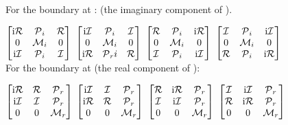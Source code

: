 \documentclass[]{iucr}              %
\numberwithin{equation}{section}
\newcommand{\Imaginary}[0]{\mathcal{I}}
\newcommand{\Real}[0]{\mathcal{R}}
\begin{document}
	
	For the boundary at \sv: (the imaginary component of \cii{}).
	
	$\begin{bmatrix}
		\textrm{i}\Real{}	& \Plus{}_i		& \Real{} \\
		0				& \Minus{}_i	& 0 \\
		\textrm{i}\Imaginary{}	& \Plus{}_i		& \Imaginary{}
	\end{bmatrix}$
	$\begin{bmatrix}
		\textrm{i}\Imaginary{}	& \Plus{}_i		&  \Imaginary{} \\
		0				& \Minus{}_i	& 0 \\
		\textrm{i}\Real{}	& \Plus{}_ri	& \Real{} \\
	\end{bmatrix}$ 
	$\begin{bmatrix}
		\Real{}	&\Plus{}_i		&   \textrm{i}\Real{} \\
		0		& \Minus{}_i	&  0 \\
		\Imaginary{}	&\Plus{}_i		& \textrm{i}\Imaginary{}
	\end{bmatrix}	$ 
	$\begin{bmatrix}
		\Imaginary{}	& \Plus{}_i	& \textrm{i}\Imaginary{} \\
		0		&\Minus{}_i	&  0 \\
		\Real{}	& \Plus{}_i	&  \textrm{i}\Real{} \\
	\end{bmatrix}$ \\
	
	
	For the boundary at \siii{} (the real component of \ciii{}):
	
	$\begin{bmatrix}
		
		\textrm{i}\Real{}	& \Real{}	& \Plus{}_r \\
		\textrm{i}\Imaginary{}	& \Imaginary{}	& \Plus{}_r  \\
		0				& 0		& \Minus{}_r  \\
	\end{bmatrix}$
	$\begin{bmatrix}
		\textrm{i}\Imaginary{}	&  \Imaginary{}	& \Plus{}_r \\
		\textrm{i}\Real{}	& \Real{}		& \Plus{}_r \\
		0				& 0			& \Minus{}_r \\
	\end{bmatrix}$ 
	$\begin{bmatrix}
		\Real{}	&   \textrm{i}\Real{}	&\Plus{}_r \\
		\Imaginary{}	& \textrm{i}\Imaginary{}	&\Plus{}_r \\
		0 		&  0				& \Minus{}_r \\
	\end{bmatrix}	$ 
	$\begin{bmatrix}
		\Imaginary{}	& \textrm{i}\Imaginary{}	& \Plus{}_r \\
		\Real{}	&  \textrm{i}\Real{}	& \Plus{}_r \\
		0		&  0				&\Minus{}_r \\
	\end{bmatrix}$ \\
	
\end{document}
